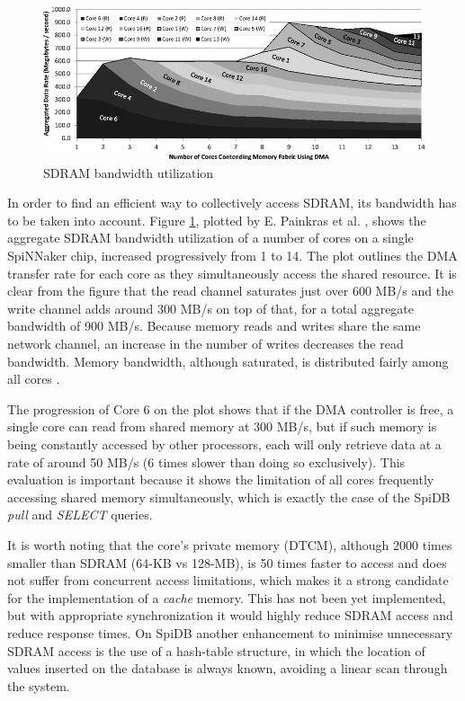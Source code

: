 \begin{figure}
\begin{center}
	\includegraphics[width=1.3\textwidth, natwidth=820, natheight=329]{images/sdram_bandwidth.png}
\end{center}
\caption{SDRAM bandwidth utilization}
\label{fig:sdram_bandwidth}
\end{figure}

In order to find an efficient way to collectively access SDRAM, its bandwidth has to be taken into account. Figure \ref{fig:sdram_bandwidth}, plotted by E. Painkras et al. \cite{painkras}, shows the aggregate SDRAM bandwidth utilization of a number of cores on a single SpiNNaker chip, increased progressively from 1 to 14. The plot outlines the DMA transfer rate for each core as they simultaneously access the shared resource. It is clear from the figure that the read channel saturates just over 600 MB/s and the write channel adds around 300 MB/s on top of that, for a total aggregate bandwidth of 900 MB/s. Because memory reads and writes share the same network channel, an increase in the number of writes decreases the read bandwidth. Memory bandwidth, although saturated, is distributed fairly among all cores \cite{painkras}. 

The progression of Core 6 on the plot shows that if the DMA controller is free, a single core can read from shared memory at 300 MB/s, but if such memory is being constantly accessed by other processors, each will only retrieve data at a rate of around 50 MB/s (6 times slower than doing so exclusively). This evaluation is important because it shows the limitation of all cores frequently accessing shared memory simultaneously, which is exactly the case of the SpiDB \textit{pull} and \textit{SELECT} queries.

It is worth noting that the core's private memory (DTCM), although 2000 times smaller than SDRAM (64-KB vs 128-MB), is 50 times faster to access and does not suffer from concurrent access limitations, which makes it a strong candidate for the implementation of a \textit{cache} memory. This has not been yet implemented, but with appropriate synchronization it would highly reduce SDRAM access and reduce response times. On SpiDB another enhancement to minimise unnecessary SDRAM access is the use of a hash-table structure, in which the location of values inserted on the database is always known, avoiding a linear scan through the system.
